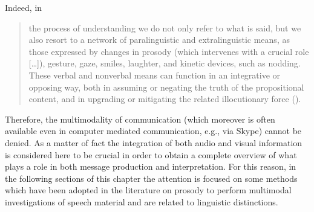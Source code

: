 \documentclass[output=paper]{langsci/langscibook}
\begin{document}
\begin{samepage}

Indeed, in 

\begin{quote}
the process of understanding we do not only refer to what is said, but we also resort to a network of paralinguistic and extralinguistic means, as those expressed by changes in prosody (which intervenes with a crucial role […]), gesture, gaze, smiles, laughter, and kinetic devices, such as nodding. These verbal and nonverbal means can function in an integrative or opposing way, both in assuming or negating the truth of the propositional content, and in upgrading or mitigating the related illocutionary force (\citealt[100]{GiliFivela2014}).
\end{quote}

\end{samepage}

Therefore, the multimodality of communication (which moreover is often available even in computer mediated communication, e.g., via Skype) cannot be denied. As a matter of fact the integration of both audio and visual information is considered here to be crucial in order to obtain a complete overview of what plays a role in both message production and interpretation. For this reason, in the following sections of this chapter the attention is focused on some methods which have been adopted in the literature on prosody to perform multimodal investigations of speech material and are related to linguistic distinctions. 
\end{document}
